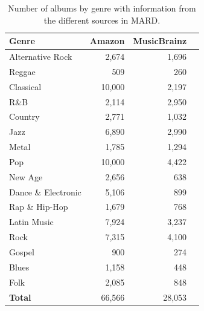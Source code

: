 \begin{table}[h]
\scriptsize
\centering
\begin{tabular}{l r r r}
\hline
\textbf{Genre} & \textbf{Amazon} & \textbf{MusicBrainz} \\%
\hline
Alternative Rock & 2,674 & 1,696 \\%
Reggae & 509 & 260 \\%
Classical & 10,000 & 2,197 \\%
R\&B & 2,114 & 2,950 \\%
Country & 2,771 & 1,032 \\%
Jazz & 6,890 & 2,990 \\%
Metal & 1,785 & 1,294 \\%
Pop & 10,000 & 4,422 \\%
New Age & 2,656 & 638 \\%
Dance \& Electronic & 5,106 & 899 \\%
Rap \& Hip-Hop & 1,679 & 768 \\%
Latin Music & 7,924 & 3,237 \\%
Rock & 7,315 & 4,100 \\%
Gospel & 900 & 274 \\%
Blues & 1,158 & 448 \\%
Folk & 2,085 & 848 \\%
\hline
\textbf{Total} & 66,566 & 28,053 \\%
\hline
\end{tabular}
\caption{Number of albums by genre with information from the different sources in MARD.}
\label{tbl:musicology:dataset}
\end{table}

